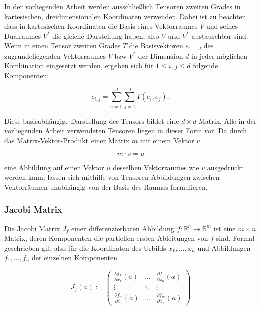 \documentclass[a4paper,fontsize=12pt,toc=bib,halfparskip,ngerman]{scrartcl}
\begin{document}
In der vorliegenden Arbeit werden ausschlie{\ss}lich Tensoren zweiten Grades in kartesischen, dreidimensionalen Koordinaten verwendet. Dabei ist zu beachten, dass in kartesischen Koordinaten die Basis eines Vektorraumes $V$ und seines Dualraumes $V^*$ die gleiche Darstellung haben, also $V$ und $V^*$ austauschbar sind. Wenn in einen Tensor zweiten Grades $T$ die Basisvektoren $e_{1,..,d}$ des zugrundeliegenden Vektorraumes $V$ bzw $V^*$ der Dimension $d$ in jeder m\"oglichen Kombination eingesetzt werden, ergeben sich f\"ur $1\leq i,j\leq d$ folgende Komponenten:

\begin{equation}
	c_{i,j} = \sum_{i=1}^{d} \sum_{j=1}^{d} T(e_i, e_j),  
\end{equation}

Diese basisabh\"angige Darstellung des Tensors bildet eine $d\times d$ Matrix. Alle in der vorliegenden Arbeit verwendeten Tensoren liegen in dieser Form vor. Da durch das Matrix-Vektor-Produkt einer Matrix $m$ mit einem Vektor $v$

\begin{equation}
	m \cdot v = u
\end{equation} 

eine Abbildung auf einen Vektor $u$ desselben Vektorraumes wie $v$ ausgedr\"uckt werden kann, lassen sich mithilfe von Tensoren Abbildungen zwischen Vektorr\"aumen unabh\"angig von der Basis des Raumes formulieren.

\subsubsection{Jacobi Matrix}
Die Jacobi Matrix $J_f$ einer differenzierbaren Abbildung $f: \mathbb{R}^n \rightarrow \mathbb{R}^m$ ist eine $m \times n$ Matrix, deren Komponenten die partiellen ersten Ableitungen von $f$ sind. Formal geschrieben gilt also f\"ur die Koordinaten des Urbilds $x_1, \dots, x_n$ und Abbildungen $f_1, ..., f_n$ der einzelnen Komponenten

\begin{equation}
J_f(a) := 
\begin{pmatrix}
\frac{\partial f_1}{\partial x_1}(a) & \dots & \frac{\partial f_1}{\partial x_n}(a)  \\
\vdots & \ddots & \vdots \\
\frac{\partial f_m}{\partial x_1}(a) & \dots & \frac{\partial f_m}{\partial x_n}(a) 
\end{pmatrix}
\end{equation}
\end{document}

